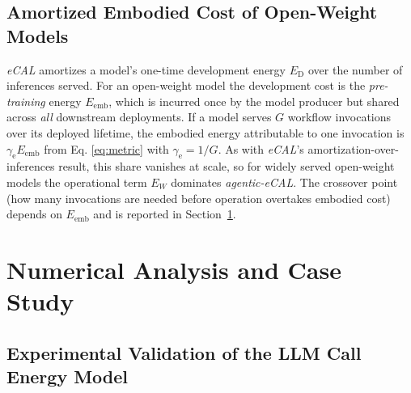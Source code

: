 \documentclass[journal]{IEEEtran}
\newcommand{\agecal}{\textit{agentic-eCAL}}
\newcommand{\ecal}{\textit{eCAL}}
\begin{document}
\subsection{Amortized Embodied Cost of Open-Weight Models}\label{sec:embodied}
\ecal{} amortizes a model's one-time development energy $E_{\mathrm{D}}$ over the number of
inferences served. For an open-weight model the development cost is the \emph{pre-training} energy
$E_{\mathrm{emb}}$, which is incurred once by the model producer but shared across \emph{all}
downstream deployments. If a model serves $G$ workflow invocations over its deployed lifetime, the
embodied energy attributable to one invocation is $\gamma_{\mathrm{e}}E_{\mathrm{emb}}$ from Eq. \ref{eq:metric} with  $\gamma_{\mathrm{e}}=1/G$. As with \ecal{}'s amortization-over-inferences result, this share
vanishes at scale, so for widely served open-weight models the operational term $E_W$ dominates
\agecal{}. The crossover point (how many invocations are needed before operation overtakes embodied cost) depends on $E_{\mathrm{emb}}$ and is reported in Section~\ref{sec:results}.

\section{Numerical Analysis and Case Study}\label{sec:results}

\subsection{Experimental Validation of the LLM Call Energy Model} 
\end{document}
